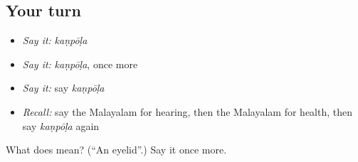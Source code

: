 \subsection*{Your turn}
\begin{itemize}
\raggedright
  \item \emph{Say it:} \emph{kaṇpōḷa}
  \item \emph{Say it:} \emph{kaṇpōḷa}, once more
  \item \emph{Say it:} say \emph{kaṇpōḷa}
  \item \emph{Recall:} say the Malayalam for hearing, then the Malayalam for health, then say \emph{kaṇpōḷa} again
\end{itemize}

\begin{tcolorbox}[breakable,colback=teal!4,colframe=teal!35!black,title={Before you move on}]
What does  mean? (\textquotedblleft{}An eyelid\textquotedblright{}.) Say it once more.
\end{tcolorbox}
